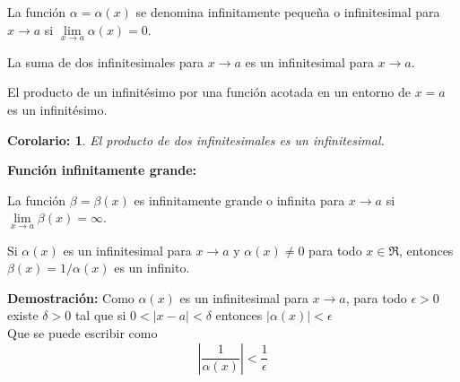 \documentclass[10pt,twoside]{SelfArx} %
\begin{document}
\begin{thm}
La función $ \alpha=\alpha(x) $ se denomina infinitamente pequeña o infinitesimal para $ x\rightarrow a $ si $ \lim\limits_{x\rightarrow a}\alpha(x)=0 $.\\
\end{thm}
\begin{teorema}
La suma  de dos infinitesimales para $ x\rightarrow a $ es un infinitesimal para $ x\rightarrow a $.\\	
\end{teorema}



\begin{teorema}
El producto de un infinitésimo por una función acotada en un  entorno de $ x=a $ es un infinitésimo.\\
\end{teorema}


\newtheorem{corolario}{Corolario:}
\begin{corolario}
El producto de dos infinitesimales es un infinitesimal.\\
\end{corolario}



\textbf{Función infinitamente grande:}
\begin{thm}
La función $ \beta=\beta(x) $ es infinitamente grande o infinita para $ x\rightarrow a $ si $ \lim\limits_{x\rightarrow a}\beta(x) =\infty$.
	
\end{thm}
\begin{teorema}
Si $ \alpha(x) $ es un infinitesimal para $ x\rightarrow a $ y $ \alpha(x)\neq 0 $ para todo $ x\in \Re $, entonces $ \beta(x)=1/\alpha(x) $ es un infinito.\\
	
\end{teorema}
\textbf{Demostración:}
Como $ \alpha(x) $ es un infinitesimal para $ x\rightarrow a $, para todo $ \epsilon>0 $ existe $ \delta>0 $ tal que si $ 0<|x-a|<\delta $ entonces $ |\alpha(x)|<\epsilon $\\
Que se puede escribir como
\[  \left|\frac{1}{\alpha(x)} \right|<\frac{1}{\epsilon}  \]
\end{document}
